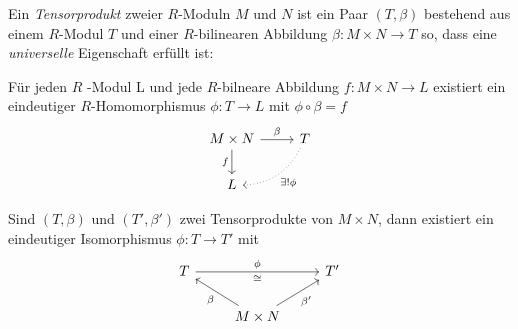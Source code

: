 \documentclass[../main.tex]{subfiles}
\begin{document}
\begin{definition}
    Ein \emph{Tensorprodukt} zweier $R$-Moduln $M$ und $N$ ist ein Paar $(T,\beta)$ bestehend aus einem $R$-Modul $T$ und einer $R$-bilinearen Abbildung $\beta:M\times N\rightarrow T$ so, dass eine \emph{universelle} Eigenschaft erfüllt ist:
    
    Für jeden $R$ -Modul L und jede $R$-bilneare Abbildung $f:M\times N\rightarrow L$ existiert ein eindeutiger $R$-Homomorphismus $\phi:T\rightarrow L$ mit $\phi\circ\beta = f$
    $$%
\begin{tikzcd}
M\times N \arrow[d, "f"'] \arrow[r, "\beta"] & T \arrow[ld, "\exists !\phi", dotted, bend left] \\
L                                            &                                                 
\end{tikzcd}$$
\end{definition}
\begin{lemma}
    Sind $(T,\beta)$ und $(T',\beta')$ zwei Tensorprodukte von $M\times N$, dann existiert ein eindeutiger Isomorphismus $\phi: T\rightarrow T'$ mit
$$%
\begin{tikzcd}
T \arrow[rr, "\phi", "\cong"'] &                                                     & T' \\
                     & M\times N \arrow[lu, "\beta"] \arrow[ru, "\beta'"'] &   
\end{tikzcd}$$
\end{lemma}
\end{document}
